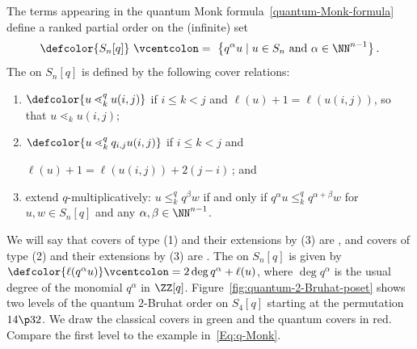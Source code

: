 The terms appearing in the quantum Monk formula~\eqref{quantum-Monk-formula} define a ranked partial order on
the (infinite) set
 \begin{equation*}
    \defcolor{S_n[q]}\  \vcentcolon=\  \big\{ q^\alpha u \mid u\in S_n \text{ and } \alpha\in\NN^{n-1}\big\}\,.
 \end{equation*}
The  on $S_n[q]$ is defined by the following cover relations:
\begin{enumerate}
    \item $\defcolor{u\lessdot_k^q u (i,j)}$ if $i\leq k<j$ and $\ell(u)+1=\ell(u (i,j))$,
         so that $u\lessdot_k u (i,j)$;
    \item $\defcolor{u\lessdot_k^q q_{i,j} u (i,j)}$ if $i\leq k<j$ and \rule{0pt}{13pt}
           $\ell(u)+1=\ell(u (i,j))+2(j{-}i)$\,; and
    \item extend $q$-multiplicatively:  $u\leq_k^q q^\beta w$  if and
        only if $q^{\alpha} u\leq_k^q q^{\alpha+\beta} w$ for $u,w\in S_n[q]$ and any $\alpha,\beta\in \NN^{n-1}$. \rule{0pt}{13pt} \vspace{2pt}
\end{enumerate}
We will say that covers of type (1) and their extensions by (3) are , and covers of type (2) and their
extensions by (3) are . 
The  on $S_n[q]$ is given by
$\defcolor{\ell(q^\alpha u)} \vcentcolon= 2 \deg q^\alpha + \ell(u)$, where $\deg q^\alpha$ is the usual degree of the 
monomial $q^\alpha$ in $\ZZ[q]$.
Figure~\ref{fig:quantum-2-Bruhat-poset} shows two levels of the quantum $2$-Bruhat order on $S_4[q]$ starting at the
permutation $14\p32$.
We draw the classical covers in green
and the quantum covers in red.
Compare the first level to the example in~\eqref{Eq:q-Monk}.
